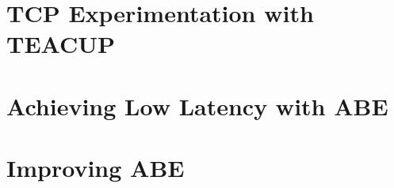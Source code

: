 \section{TCP Experimentation with TEACUP}
















\section{Achieving Low Latency with ABE}













\section{Improving ABE}

